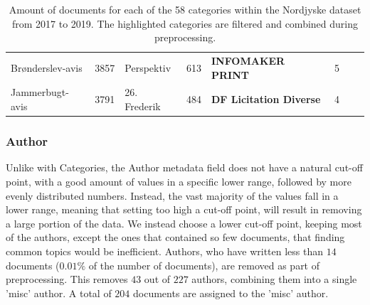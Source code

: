 \begin{table}[h]
\begin{tabular}{l|c|l|c|l|c|l|c}
		Brønderslev-avis    &  3857  & Perspektiv      &  613   & \textbf{INFOMAKER PRINT}       &   5    &                             &        \\
		Jammerbugt-avis     &  3791  & 26. Frederik    &  484   & \textbf{DF Licitation Diverse} &   4    &                             &        \\
		\bottomrule
	\end{tabular}
	\caption{Amount of documents for each of the 58 categories within the Nordjyske dataset from 2017 to 2019.
		The highlighted categories are filtered and combined during preprocessing.}
	\label{tab:category_table}
\end{table}


\subsubsection{Author}\label{subsec:appendix_author}
Unlike with Categories, the Author metadata field does not have a natural cut-off point, with a good amount of values in a specific lower range, followed by more evenly distributed numbers.
Instead, the vast majority of the values fall in a lower range, meaning that setting too high a cut-off point, will result in removing a large portion of the data.
We instead choose a lower cut-off point, keeping most of the authors, except the ones that contained so few documents, that finding common topics would be inefficient.
Authors, who have written less than $14$ documents ($0.01\%$ of the number of documents), are removed as part of preprocessing.
This removes $43$ out of $227$ authors, combining them into a single 'misc' author.
A total of $204$ documents are assigned to the 'misc' author.

